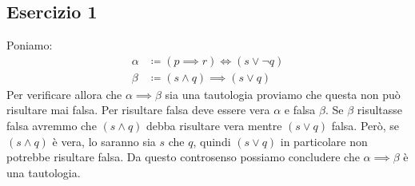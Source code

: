 \subsection*{Esercizio 1}
Poniamo:
\begin{align*}
	\alpha &\coloneqq (p \implies r) \iff(s \lor \neg q) \\
	\beta &\coloneqq (s \land q) \implies (s \lor q)
\end{align*} 
Per verificare allora che $\alpha \implies \beta$ sia una tautologia proviamo che questa non può risultare mai falsa. Per risultare falsa deve essere vera $\alpha$ e falsa $\beta$. Se $\beta$ risultasse falsa avremmo che $(s \land q)$ debba risultare vera mentre $(s \lor q)$ falsa. Però, se $(s \land q)$ è vera, lo saranno sia $s$ che $q$, quindi $(s \lor q)$ in particolare non potrebbe risultare falsa. Da questo controsenso possiamo concludere che $\alpha \implies \beta$ è una tautologia. \hfill \blacksquare
